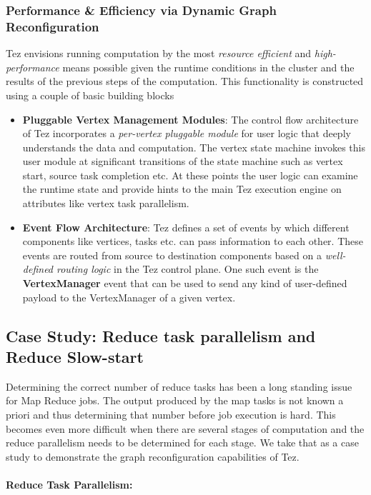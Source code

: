 \documentclass[twocolumn]{article}
\begin{document}
\subsubsection{Performance \& Efficiency via Dynamic Graph
Reconfiguration}

Tez envisions running computation by the most \emph{resource efficient}
and \emph{high-performance} means possible given the runtime conditions
in the cluster and the results of the previous steps of the computation.
This functionality is constructed using a couple of basic building
blocks

\begin{itemize}
\item
  \textbf{Pluggable Vertex Management Modules}: The control flow
  architecture of Tez incorporates a \emph{per-vertex pluggable module}
  for user logic that deeply understands the data and computation. The
  vertex state machine invokes this user module at significant
  transitions of the state machine such as vertex start, source task
  completion etc. At these points the user logic can examine the runtime
  state and provide hints to the main Tez execution engine on attributes
  like vertex task parallelism.
\item
  \textbf{Event Flow Architecture}: Tez defines a set of events by which
  different components like vertices, tasks etc. can pass information to
  each other. These events are routed from source to destination
  components based on a \emph{well-defined routing logic} in the Tez
  control plane. One such event is the \textbf{VertexManager} event that
  can be used to send any kind of user-defined payload to the
  VertexManager of a given vertex.
\end{itemize}

\subsection{Case Study: Reduce task parallelism and Reduce Slow-start}

Determining the correct number of reduce tasks has been a long standing
issue for Map Reduce jobs. The output produced by the map tasks is not
known a priori and thus determining that number before job execution is
hard. This becomes even more difficult when there are several stages of
computation and the reduce parallelism needs to be determined for each
stage. We take that as a case study to demonstrate the graph
reconfiguration capabilities of Tez.

\paragraph{Reduce Task Parallelism:}
\end{document}
